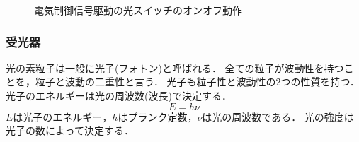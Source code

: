 \begin{figure}[t!]
 \begin{center}
  \caption{電気制御信号駆動の光スイッチのオンオフ動作}
  \label{fig:swich910}
 \end{center}
\end{figure}

\subsubsection{受光器}
光の素粒子は一般に光子(フォトン)と呼ばれる．
全ての粒子が波動性を持つことを，粒子と波動の二重性と言う．
光子も粒子性と波動性の2つの性質を持つ\cite{大津}．
光子のエネルギーは光の周波数(波長)で決定する．
\begin{equation}
E = h \nu \label{eq:hikarienergy}
\end{equation}
$Eは光子のエネルギー，hはプランク定数，\nu$は光の周波数である．
光の強度は光子の数によって決定する．

